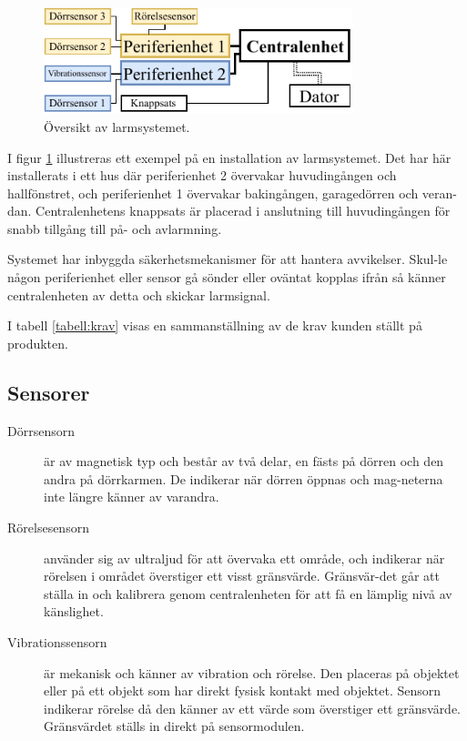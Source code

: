 \documentclass[a4paper]{article}
\begin{document}
\begin{figure}
\centering\includegraphics[width=0.8\textwidth]{figurer/systemoversiktfigur1.pdf}
\caption{Översikt av larmsystemet.}
\label{figur:översikt}
\end{figure}

I figur \ref{figur:översikt} illustreras ett exempel på en installation av larmsystemet. Det har här installerats i ett hus där periferienhet 2 övervakar huvudingången och hallfönstret, och periferienhet 1 övervakar bakingången, garagedörren och veran-dan. Centralenhetens knappsats är placerad i anslutning till huvudingången för snabb tillgång till på- och avlarmning.

Systemet har inbyggda säkerhetsmekanismer för att hantera avvikelser. Skul-le någon periferienhet eller sensor gå sönder eller oväntat kopplas ifrån så känner centralenheten av detta och skickar larmsignal.

I tabell \ref{tabell:krav} visas en sammanställning av de krav kunden ställt på produkten.

\subsection*{Sensorer}
\begin{description}
\item[Dörrsensorn] är av magnetisk typ och består av två delar, en fästs på dörren och den andra på dörrkarmen. De indikerar när dörren öppnas och mag-neterna inte längre känner av varandra.
\item[Rörelsesensorn] använder sig av ultraljud för att övervaka ett område, och indikerar när rörelsen i området överstiger ett visst gränsvärde. Gränsvär-det går att ställa in och kalibrera genom centralenheten för att få en lämplig nivå av känslighet.
\item[Vibrationssensorn] är mekanisk och känner av vibration och rörelse\cite{vibrationsSensor}. Den placeras på objektet eller på ett objekt som har direkt fysisk kontakt med objektet. Sensorn indikerar rörelse då den känner av ett värde som överstiger ett gränsvärde. Gränsvärdet ställs in direkt på sensormodulen.
\end{description}
\end{document}
